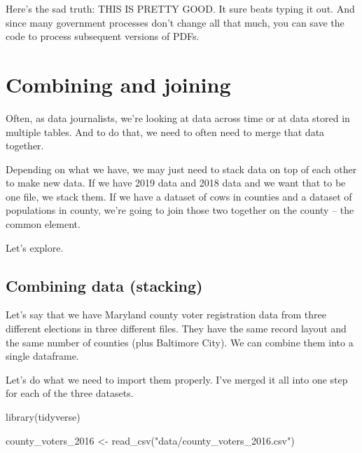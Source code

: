 \documentclass[
  letterpaper,
  DIV=11,
  numbers=noendperiod]{scrreprt}
\newenvironment{Shaded}{\begin{snugshade}}{\end{snugshade}}
\newcommand{\FunctionTok}[1]{\textcolor[rgb]{0.28,0.35,0.67}{#1}}
\newcommand{\NormalTok}[1]{\textcolor[rgb]{0.00,0.23,0.31}{#1}}
\newcommand{\OtherTok}[1]{\textcolor[rgb]{0.00,0.23,0.31}{#1}}
\newcommand{\StringTok}[1]{\textcolor[rgb]{0.13,0.47,0.30}{#1}}
\begin{document}
Here's the sad truth: THIS IS PRETTY GOOD. It sure beats typing it out.
And since many government processes don't change all that much, you can
save the code to process subsequent versions of PDFs.


\hypertarget{combining-and-joining}{%
\chapter{Combining and joining}\label{combining-and-joining}}

Often, as data journalists, we're looking at data across time or at data
stored in multiple tables. And to do that, we need to often need to
merge that data together.

Depending on what we have, we may just need to stack data on top of each
other to make new data. If we have 2019 data and 2018 data and we want
that to be one file, we stack them. If we have a dataset of cows in
counties and a dataset of populations in county, we're going to join
those two together on the county -- the common element.

Let's explore.

\hypertarget{combining-data-stacking}{%
\section{Combining data (stacking)}\label{combining-data-stacking}}

Let's say that we have Maryland county voter registration data from
three different elections in three different files. They have the same
record layout and the same number of counties (plus Baltimore City). We
can combine them into a single dataframe.

Let's do what we need to import them properly. I've merged it all into
one step for each of the three datasets.

\begin{Shaded}
\begin{Highlighting}[]
\FunctionTok{library}\NormalTok{(tidyverse)}
\end{Highlighting}
\end{Shaded}

\begin{Shaded}
\begin{Highlighting}[]
\NormalTok{county\_voters\_2016 }\OtherTok{\textless{}{-}} \FunctionTok{read\_csv}\NormalTok{(}\StringTok{"data/county\_voters\_2016.csv"}\NormalTok{)}
\end{Highlighting}
\end{Shaded}
\end{document}
